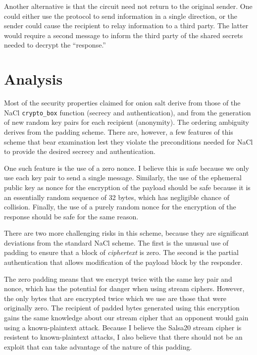\documentclass[letterpaper,twocolumn,amsmath,amssymb,pre,aps,10pt]{revtex4-1}
\begin{document}
Another alternative is that the circuit need not return to the
original sender.  One could either use the protocol to send
information in a single direction, or the sender could cause the
recipient to relay information to a third party.  The latter would
require a second message to inform the third party of the shared
secrets needed to decrypt the ``response.''

\section{Analysis}

Most of the security properties claimed for onion salt derive from
those of the NaCl \texttt{crypto\_box} function (secrecy and
authentication), and from the generation of new random key pairs for
each recipient (anonymity).  The ordering ambiguity derives from the
padding scheme.  There are, however, a few features of this scheme
that bear examination lest they violate the preconditions needed for
NaCl to provide the desired secrecy and authentication.

One such feature is the use of a zero nonce.  I believe this is safe
because we only use each key pair to send a single message.
Similarly, the use of the ephemeral public key as nonce for the
encryption of the payload should be safe because it is an essentially
random sequence of 32 bytes, which has negligible chance of
collision.  Finally, the use of a purely random nonce for the
encryption of the response should be safe for the same reason.

There are two more challenging risks in this scheme, because they are
significant deviations from the standard NaCl scheme.  The first is
the unusual use of padding to ensure that a block of \emph{ciphertext}
is zero.  The second is the partial authentication that allows
modification of the payload block by the responder.

The zero padding means that we encrypt twice with the same key pair
and nonce, which has the potential for danger when using stream
ciphers.  However, the only bytes that are encrypted twice which we
use are those that were originally zero.  The recipient of padded
bytes generated using this encryption gains the same knowledge about
our stream cipher that an opponent would gain using a known-plaintext
attack.  Because I believe the Salsa20 stream cipher is resistent to
known-plaintext attacks, I also believe that there should not be an
exploit that can take advantage of the nature of this padding.
\end{document}
